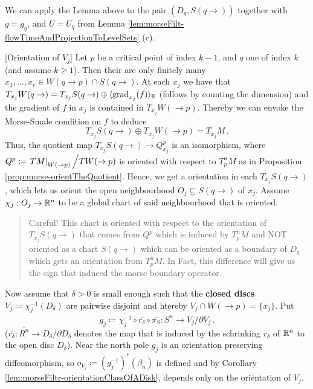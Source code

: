 \begin{remark}\label{rem:morseFiltr-orientDQwithGQ}
	We can apply the Lemma above to the pair $(D_q,S(q\to))$ together with $g=g_q$, and $U=U_q$ from Lemma \ref{lem:morseFilt-flowTimeAndProjectionToLevelSets} (c). 
\end{remark}

\begin{definition}\label{def:morseFiltr-defiunitionVj}[Orientation of $V_j$]
	Let $p$ be a critical point of index $k-1$, and $q$ one of index $k$ (and assume $k\geq 1$). Then their are only finitely many $x_1,\dots,x_r\in W(q\to p)\cap S(q\to)$. At each $x_j$ we have that $T_{x_j}W(q\to)=T_{x_j}S(q\to)\oplus \langle \mathrm{grad}_{x_j}(f)\rangle_{\mathbb{R}}$ (follows by counting the dimension) and the gradient of $f$ in $x_j$ is contained in $T_{x_j}W(\to p)$. Thereby we can envoke the Morse-Smale condition on $f$ to deduce
	\begin{equation*}
		T_{x_j}S(q\to)\oplus T_{x_j}W(\to p)=T_{x_j}M\,.
	\end{equation*} Thus, the quotient map $T_{x_j}S(q\to)\to Q^p_{x_j}$ is an isomorphism, where $Q^p\coloneq \left.TM\right|_{W(\to p)}\Big/ TW(\to p)$ is oriented with respect to $T^u_pM$ as in Proposition \ref{prop:morse-orientTheQuotient}. Hence, we get a orientation in each $T_{x_j}S(q\to)$, which lets us orient the open neighbourhood $O_j\subseteq S(q\to)$ of $x_j$. Assume $\chi_j:O_j\to \mathbb{R}^n$ to be a global chart of said neighbourhood that is oriented.\begin{quote}
		Careful! This chart is oriented with respect to the orientation of $T_{x_j}S(q\to)$ that comes from $Q^p$ which is induced by $T^u_pM$ and NOT oriented as a chart    $S(q\to)$ which can be oriented as a boundary of $D_q$ which gets an orientation from $T^u_pM$. In Fact, this difference will give us the sign that induced the morse boundary operator.  
	\end{quote}
	Now assume that $ \delta>0$ is small enough such that the \textbf{closed discs} $V_j\coloneq \chi_j^{-1}(D_\delta)$ are pairwise disjoint and htereby $V_j\cap W(\to p)=\{x_j\}$. Put
	\begin{equation*}
		g_j\coloneq \overline{\chi_j^{-1}}\circ \overline{r_\delta}\circ \overline{\pi_S}:
		S^n \to V_j/\partial V_j\,.
	\end{equation*}($\overline{r_\delta}:\overline{R^n}\to D_\delta /\partial D_\delta$ denotes the map that is induced by the schrinking $r_\delta$ of $\mathbb{R}^n$ to the open disc $D_\delta$). Near the north pole $g_j$ is an orientation preserving diffeomorphism, so $o_{V_j}\coloneq (g_j^{-1})^*(\beta_n)$ is defined and by Corollary \ref{lem:morseFiltr-orientationClassOfADisk}, depends only on the orientation of $V_j$.
	

\end{definition}
